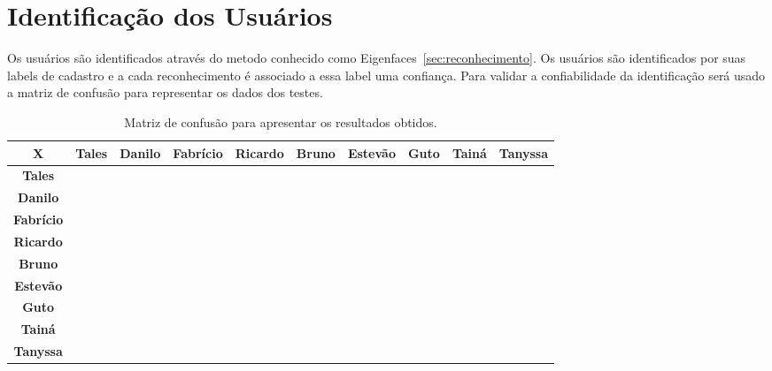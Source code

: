 \section{Identificação dos Usuários}
	
	Os usuários são identificados através do metodo conhecido como
	Eigenfaces~\ref{sec:reconhecimento}. Os usuários são identificados por suas
	labels de cadastro e a cada reconhecimento é associado a essa label uma
	confiança. Para validar a confiabilidade da identificação será usado a matriz
	de confusão para representar os dados dos testes.
	
	\begin{table}[H]
		\begin{center}
			\caption{Matriz de confusão para apresentar os resultados obtidos.}
			\begin{tabular}{|c|c|c|c|c|c|c|c|c|c|}
				\hline \bf X & \bf Tales & \bf Danilo & \bf Fabrício & \bf Ricardo & \bf
				Bruno & \bf Estevão & \bf Guto & \bf Tainá & \bf Tanyssa \\
				\hline \bf Tales & & & & & & & & & \\
				\hline \bf Danilo & & & & & & & & & \\
				\hline \bf Fabrício & & & & & & & & & \\
				\hline \bf Ricardo & & & & & & & & & \\
				\hline \bf Bruno & & & & & & & & & \\
				\hline \bf Estevão & & & & & & & & & \\
				\hline \bf Guto & & & & & & & & & \\
				\hline \bf Tainá & & & & & & & & & \\
				\hline \bf Tanyssa & & & & & & & & & \\
				\hline
			\end{tabular}
		\end{center}
		\label{tab:tabelaRequisitosTeoricos}
	\end{table}
